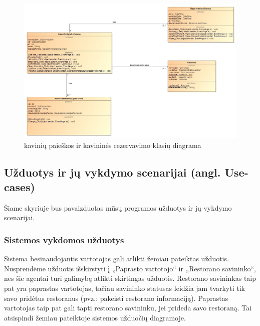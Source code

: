 \documentclass{VUMIFPSkursinis}
\begin{document}
{{{{{\begin{figure}[H]
    \centering
    \includegraphics[width=\textwidth,height=\textheight,keepaspectratio]{img/LoginForm_Address_Booking} 
    \caption{kavinių paieškos ir kavininės rezervavimo klasių diagrama}
    \label{img:LoginForm_Address_Booking}
\end{figure}
\pagebreak
\subsection{Užduotys ir jų vykdymo scenarijai (angl. Use-cases)}
Šiame skyriuje bus pavaizduotas mūsų programos užduotys ir jų vykdymo scenarijai.
\subsubsection{Sistemos vykdomos užduotys}

Sistema besinaudojantis vartotojas gali atlikti žemiau pateiktas užduotis. Nusprendėme užduotis išskirstyti į „Paprasto vartotojo“ ir „Restorano savininko“, nes šie agentai turi galimybę atlikti skirtingas užduotis. Restorano savininkas taip pat yra paprastas vartotojas, tačiau savininko statusas leidžia jam tvarkyti tik savo pridėtus restoranus (pvz.: pakeisti restorano informaciją). Paprastas vartotojas taip pat gali tapti restorano savininku, jei prideda savo restoraną. Tai atsispindi žemiau pateiktoje sistemos užduočių diagramoje.

}}}}}
\end{document}
